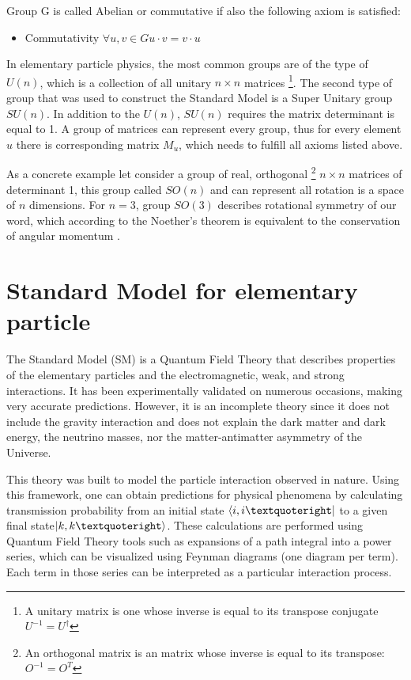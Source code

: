 Group G is called Abelian or commutative if also the following axiom is satisfied:
\begin{itemize}
    \item Commutativity $\forall u,v \in G u \cdot v = v \cdot u$
\end{itemize}

In elementary particle physics, the most common groups are of the type of $U(n)$, which is a collection of all unitary $n\times n$ matrices \footnote{A unitary matrix is one whose inverse is equal to its transpose conjugate $U^{-1}=U^\dagger$}. The second type of group that was used to construct the Standard Model is a Super Unitary group $SU(n)$. In addition to the $U(n)$, $SU(n)$ requires the matrix determinant is equal to 1. 
A group of matrices can represent every group, thus for every element $u$ there is corresponding matrix $M_u$, which needs to fulfill all axioms listed above. 

As a concrete example let consider a group of real, orthogonal \footnote{An orthogonal matrix is an matrix whose inverse is equal to its transpose: $O^{-1} = O^{T}$} $n\times n$ matrices of determinant 1, this group called $SO(n)$ and can represent all rotation is a space of $n$ dimensions. For $n=3$, group $SO(3)$  describes rotational symmetry of our word, which according to the Noether’s theorem is equivalent to the conservation of angular momentum \cite{griffiths}. 

\section{Standard Model for elementary particle}
\label{sec:SM}

The Standard Model (SM) is a Quantum Field Theory that describes properties of the elementary particles and the electromagnetic, weak, and strong interactions. It has been experimentally validated on numerous occasions,
making very accurate predictions. However, it is an incomplete theory since it does not include the gravity interaction and does not explain the dark matter and dark energy, the neutrino masses, nor the matter-antimatter asymmetry of the Universe.

This theory was built to model the particle interaction observed in nature. Using this framework, one can obtain predictions for physical phenomena by calculating transmission probability from an initial state $\bra{i, i’}$ to a given final state$\ket{k, k’ }$. These calculations are performed using Quantum Field Theory tools such as expansions of a path integral into a power series, which can be visualized using Feynman diagrams (one diagram per term). Each term in those series can be interpreted as a particular interaction process. 

